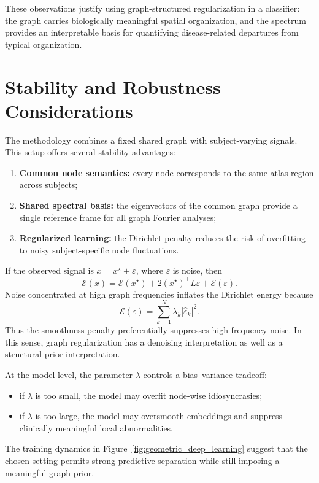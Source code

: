 These observations justify using graph-structured regularization in a classifier: the graph carries biologically meaningful spatial organization, and the spectrum provides an interpretable basis for quantifying disease-related departures from typical organization.

\section{Stability and Robustness Considerations}
\label{sec:ch4_robustness} %

The methodology combines a fixed shared graph with subject-varying signals. This setup offers several stability advantages:
\begin{enumerate}[label=(\arabic*)] %
    \item \textbf{Common node semantics:} every node corresponds to the same atlas region across subjects;
    \item \textbf{Shared spectral basis:} the eigenvectors of the common graph provide a single reference frame for all graph Fourier analyses;
    \item \textbf{Regularized learning:} the Dirichlet penalty reduces the risk of overfitting to noisy subject-specific node fluctuations.
\end{enumerate}

If the observed signal is \(x = x^\star + \varepsilon\), where \(\varepsilon\) is noise, then
\begin{equation}
\mathcal{E}(x)
=
\mathcal{E}(x^\star)
+
2(x^\star)^\top L \varepsilon %
+
\mathcal{E}(\varepsilon).
\end{equation}
Noise concentrated at high graph frequencies inflates the Dirichlet energy because
\begin{equation}
\mathcal{E}(\varepsilon)=\sum_{k=1}^{N}\lambda_k |\hat\varepsilon_k|^2.
\end{equation}
Thus the smoothness penalty preferentially suppresses high-frequency noise. In this sense, graph regularization has a denoising interpretation as well as a structural prior interpretation.

At the model level, the parameter \(\lambda\) controls a bias--variance tradeoff: %
\begin{itemize}
    \item if \(\lambda\) is too small, the model may overfit node-wise idiosyncrasies;
    \item if \(\lambda\) is too large, the model may oversmooth embeddings and suppress clinically meaningful local abnormalities.
\end{itemize}
The training dynamics in Figure~\ref{fig:geometric_deep_learning} suggest that the chosen setting permits strong predictive separation while still imposing a meaningful graph prior.

